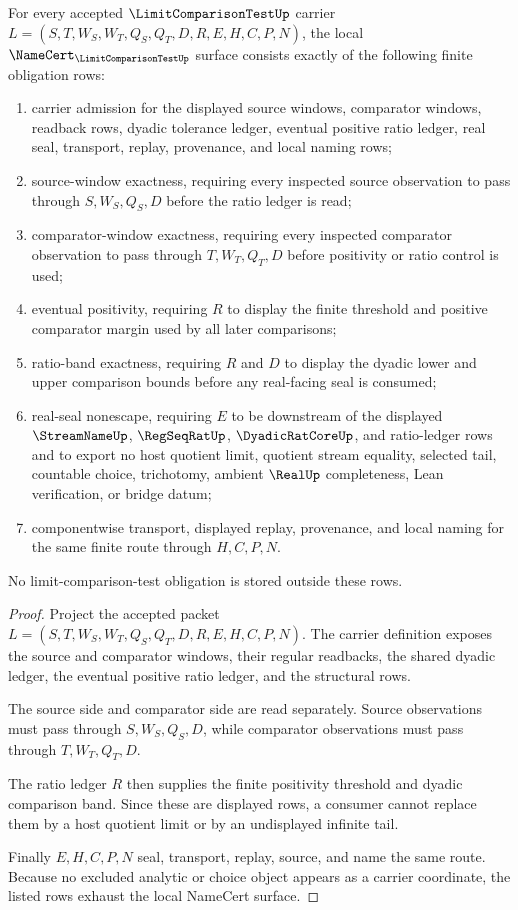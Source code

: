 \begin{theorem}\label{thm:limit-comparison-test-namecert-obligations}
For every accepted $\LimitComparisonTestUp$ carrier $L=(S,T,W_S,W_T,Q_S,Q_T,D,R,E,H,C,P,N)$, the local $\NameCert_{\LimitComparisonTestUp}$ surface consists exactly of the following finite obligation rows:
\begin{enumerate}
\item carrier admission for the displayed source windows, comparator windows, readback rows, dyadic tolerance ledger, eventual positive ratio ledger, real seal, transport, replay, provenance, and local naming rows;
\item source-window exactness, requiring every inspected source observation to pass through $S,W_S,Q_S,D$ before the ratio ledger is read;
\item comparator-window exactness, requiring every inspected comparator observation to pass through $T,W_T,Q_T,D$ before positivity or ratio control is used;
\item eventual positivity, requiring $R$ to display the finite threshold and positive comparator margin used by all later comparisons;
\item ratio-band exactness, requiring $R$ and $D$ to display the dyadic lower and upper comparison bounds before any real-facing seal is consumed;
\item real-seal nonescape, requiring $E$ to be downstream of the displayed $\StreamNameUp$, $\RegSeqRatUp$, $\DyadicRatCoreUp$, and ratio-ledger rows and to export no host quotient limit, quotient stream equality, selected tail, countable choice, trichotomy, ambient $\RealUp$ completeness, Lean verification, or bridge datum;
\item componentwise transport, displayed replay, provenance, and local naming for the same finite route through $H,C,P,N$.
\end{enumerate}
No limit-comparison-test obligation is stored outside these rows.
\end{theorem}
\begin{proof}
Project the accepted packet $L=(S,T,W_S,W_T,Q_S,Q_T,D,R,E,H,C,P,N)$. The carrier definition exposes the source and comparator windows, their regular readbacks, the shared dyadic ledger, the eventual positive ratio ledger, and the structural rows.

The source side and comparator side are read separately. Source observations must pass through $S,W_S,Q_S,D$, while comparator observations must pass through $T,W_T,Q_T,D$.

The ratio ledger $R$ then supplies the finite positivity threshold and dyadic comparison band. Since these are displayed rows, a consumer cannot replace them by a host quotient limit or by an undisplayed infinite tail.

Finally $E,H,C,P,N$ seal, transport, replay, source, and name the same route. Because no excluded analytic or choice object appears as a carrier coordinate, the listed rows exhaust the local NameCert surface.
\end{proof}

